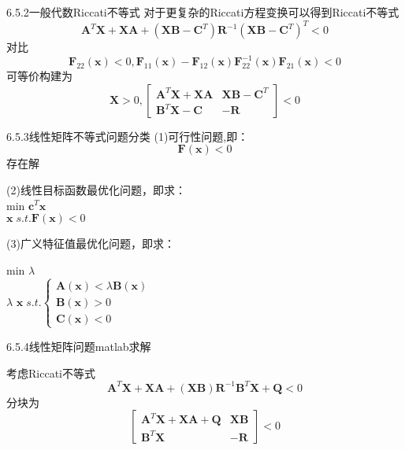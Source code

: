 \documentclass[12pt]{beamer}
\begin{document}
\begin{frame}[allowframebreaks]{6.5.2一般代数Riccati不等式}
对于更复杂的Riccati方程变换可以得到Riccati不等式
\[\boldsymbol{A}^{T}\boldsymbol{X}+\boldsymbol{X}\boldsymbol{A}+\left ( \boldsymbol{X}\boldsymbol{B}-\boldsymbol{C}^{T}\right )\boldsymbol{R}^{-1}\left ( \boldsymbol{X}\boldsymbol{B}-\boldsymbol{C}^{T}\right )^{T}< 0\]
对比
\[\boldsymbol{F}_{22}\left ( \boldsymbol{x}\right )< 0,\boldsymbol{F}_{11}\left ( \boldsymbol{x}\right )-\boldsymbol{F}_{12}\left ( \boldsymbol{x}\right )\boldsymbol{F}_{22}^{-1}\left ( \boldsymbol{x}\right )\boldsymbol{F}_{21}\left ( \boldsymbol{x}\right )< 0\]
可等价构建为
\[\boldsymbol{X}> 0,\begin{bmatrix}
\boldsymbol{A}^{T}\boldsymbol{X}+\boldsymbol{X}\boldsymbol{A} & \boldsymbol{XB}-\boldsymbol{C}^{T}\\ 
\boldsymbol{B}^{T}\boldsymbol{X}-\boldsymbol{C}& -\boldsymbol{R}
\end{bmatrix}< 0\]
\end{frame}
\begin{frame}[allowframebreaks]{6.5.3线性矩阵不等式问题分类}
(1)可行性问题,即：
\[\boldsymbol{F}\left ( \boldsymbol{x}\right )< 0\]
存在解

(2)线性目标函数最优化问题，即求：
\\	\qquad \qquad\qquad\qquad\qquad\qquad min  
$
\boldsymbol{c}^{T}\boldsymbol{x}
$
\\\qquad\qquad\qquad\qquad\qquad
$
\boldsymbol{x}\;s.t.
\boldsymbol{F}\left ( \boldsymbol{x}\right )< 0
$

(3)广义特征值最优化问题，即求：

	\qquad \qquad\qquad\qquad\qquad\qquad min 
$
\lambda 
$
\\\qquad\qquad\qquad\qquad
$
\lambda $ $\textbf{x}\;s.t.
\left\{
\begin{array}{ccc}
\boldsymbol{A}\left ( \boldsymbol{x}\right )< \lambda \boldsymbol{B}\left ( \boldsymbol{x}\right ) \\
\boldsymbol{B}\left ( \boldsymbol{x}\right )> 0\\
\boldsymbol{C}\left ( \boldsymbol{x}\right )< 0 
\end{array} 
\right.
$

\end{frame}

\begin{frame}[allowframebreaks]{6.5.4线性矩阵问题matlab求解}

考虑Riccati不等式
\[\boldsymbol{A}^{T}\boldsymbol{X}+\boldsymbol{X}\boldsymbol{A}+\left ( \boldsymbol{X}\boldsymbol{B}\right )\boldsymbol{R}^{-1} \boldsymbol{B}^{T}\boldsymbol{X}+\boldsymbol{Q}< 0\]
分块为\[\begin{bmatrix}
\boldsymbol{A}^{T}\boldsymbol{X}+\boldsymbol{X}\boldsymbol{A}+\boldsymbol{Q} &\boldsymbol{X}\boldsymbol{B} \\ 
\boldsymbol{B}^{T}\boldsymbol{X} & -\boldsymbol{R}
\end{bmatrix}< 0\]

\end{frame}
\end{document}
